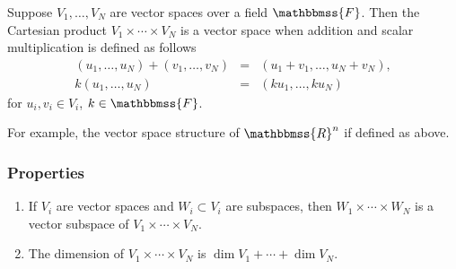 \documentclass[12pt]{article}
\newcommand{\F}{\mathbbmss{F}}
\newcommand{\R}{\mathbbmss{R}}
\begin{document}
Suppose $V_1,\ldots, V_N$ are vector spaces over a field $\F$.
Then the Cartesian product $V_1\times \cdots \times V_N$ is a vector space
when addition and scalar multiplication is  defined as follows
\begin{eqnarray*}
   (u_1,\ldots, u_N) +    (v_1,\ldots, v_N) &=&    (u_1+v_1,\ldots, u_N+v_N), \\
   k (u_1,\ldots, u_N) &=& (k u_1,\ldots, k u_N)
\end{eqnarray*}
for $u_i, v_i \in V_i$, $k\in \F$.

For example, the vector space structure of $\R^n$ if defined as above.

\subsubsection*{Properties}
\begin{enumerate}
\item If $V_i$ are vector spaces and $W_i\subset V_i$ are subspaces,
    then $W_1\times \cdots \times W_N$ is a vector subspace of 
    $V_1\times \cdots \times V_N$.
\item The dimension of $V_1\times \cdots \times V_N$ is 
    $\dim V_1+ \cdots +\dim V_N$.
\end{enumerate}
\end{document}
